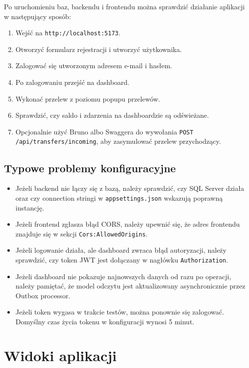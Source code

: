 \documentclass[12pt,a4paper]{article}
\begin{document}
Po uruchomieniu baz, backendu i frontendu można sprawdzić działanie aplikacji w następujący sposób:
\begin{enumerate}[nosep]
    \item Wejść na \texttt{http://localhost:5173}.
    \item Otworzyć formularz rejestracji i utworzyć użytkownika.
    \item Zalogować się utworzonym adresem e-mail i hasłem.
    \item Po zalogowaniu przejść na dashboard.
    \item Wykonać przelew z poziomu popupu przelewów.
    \item Sprawdzić, czy saldo i zdarzenia na dashboardzie są odświeżane.
    \item Opcjonalnie użyć Bruno albo Swaggera do wywołania \texttt{POST /api/transfers/incoming}, aby zasymulować przelew przychodzący.
\end{enumerate}

\subsection{Typowe problemy konfiguracyjne}

\begin{itemize}
    \item Jeżeli backend nie łączy się z bazą, należy sprawdzić, czy SQL Server działa oraz czy connection stringi w \texttt{appsettings.json} wskazują poprawną instancję.
    \item Jeżeli frontend zgłasza błąd CORS, należy upewnić się, że adres frontendu znajduje się w sekcji \texttt{Cors:AllowedOrigins}.
    \item Jeżeli logowanie działa, ale dashboard zwraca błąd autoryzacji, należy sprawdzić, czy token JWT jest dołączany w nagłówku \texttt{Authorization}.
    \item Jeżeli dashboard nie pokazuje najnowszych danych od razu po operacji, należy pamiętać, że model odczytu jest aktualizowany asynchronicznie przez Outbox processor.
    \item Jeżeli token wygasa w trakcie testów, można ponownie się zalogować. Domyślny czas życia tokenu w konfiguracji wynosi 5 minut.
\end{itemize}

\section{Widoki aplikacji}
\end{document}
